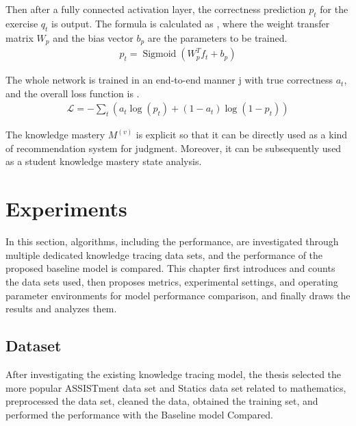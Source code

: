 Then after a fully connected activation layer, the correctness prediction \(p_t\) for the exercise \(q_t\) is output. The formula is calculated as \eqname{\ref{fml:ch3-predicting-function-p}}, where the weight transfer matrix \(W_p\) and the bias vector \(b_p\) are the parameters to be trained.
\begin{align}\label{fml:ch3-predicting-function-p}
    p_t = \operatorname{Sigmoid}(W_p^T f_t + b_p)
\end{align}

The whole network is trained in an end-to-end manner j with true correctness \(a_t\), and the overall loss function is \eqname{\ref{fml:ch3-loss}}.
\begin{align}\label{fml:ch3-loss}
    \mathcal{L} = -\sum\limits_{t}{(a_t\log(p_t)+(1-a_t)\log(1-p_t))}
\end{align}

The knowledge mastery \(M^{(v)}\) is explicit so that it can be directly used as a kind of recommendation system for judgment. Moreover, it can be subsequently used as a student knowledge mastery state analysis.

\section{Experiments}
In this section, algorithms, including the performance, are investigated through multiple dedicated knowledge tracing data sets, and the performance of the proposed baseline model is compared. This chapter first introduces and counts the data sets used, then proposes metrics, experimental settings, and operating parameter environments for model performance comparison, and finally draws the results and analyzes them.

\subsection{Dataset}
After investigating the existing knowledge tracing model, the thesis selected the more popular ASSISTment data set and Statics data set related to mathematics, preprocessed the data set, cleaned the data, obtained the training set, and performed the performance with the Baseline model Compared.

